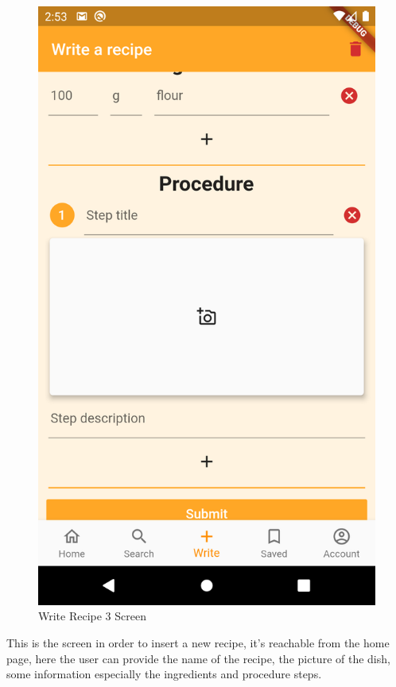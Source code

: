 \begin{figure}[H]
\begin{minipage}{0.31\textwidth}
		\includegraphics[width = .9\linewidth]{img/Write_3.png}
		\caption{Write Recipe 3 Screen}
	\end{minipage}
\end{figure}
This is the screen in order to insert a new recipe, it's reachable from the home page, here the user can provide the name of the recipe, the picture of the dish, some information especially the ingredients and procedure steps.
